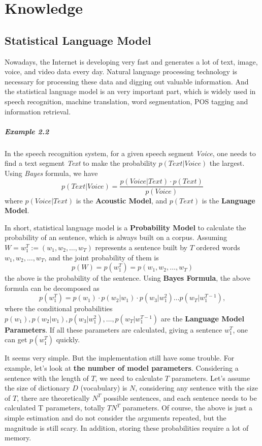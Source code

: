 
\chapter{Knowledge}
\label{cha:knowledgei}

\section{Statistical Language Model}
Nowadays, the Internet is developing very fast and generates a lot of text, image, voice, and video data every day. Natural language processing technology is necessary for processing these data and digging out valuable information. And the statistical language model is an very important part, which is widely used in speech recognition, machine translation, word segmentation, POS tagging and information retrieval. 
\paragraph{Example 2.2} In the speech recognition system, for a given speech segment \emph{Voice}, one needs to find a text segment \emph{Text} to make the probability $p(Text|Voice)$ the largest. Using \emph{Bayes} formula, we have
$$p(Text|Voice)=\frac{p(Voice|Text)\cdot p(Text)}{p(Voice)}$$
where $p(Voice|Text)$ is the \textbf{Acoustic Model}, and $p(Text)$ is the \textbf{Language Model}.

In short, statistical language model is a \textbf{Probability Model} to calculate the probability of an sentence, which is always built on a corpus. Assuming $W=w^T_1:=(w_1,w_2,\ldots,w_T)$ represents a sentence built by $T$ ordered words $w_1,w_2,\ldots,w_T$, and the joint probability of them is
$$p(W)=p(w^T_1)=p(w_1,w_2,\ldots,w_T)$$
the above is the probability of the sentence. Using \textbf{Bayes Formula}, the above formula can be decomposed as
\begin{equation}
p(w^T_1) = p(w_1)\cdot p(w_2|w_1)\cdot p(w_3|w^2_1)\ldots p(w_T|w^{T-1}_1),
\end{equation}
where the conditional probabilities $p(w_1),p(w_2|w_1),p(w_3|w^2_1),\ldots,p(w_T|w^{T-1}_1)$ are the \textbf{Language Model Parameters}. If all these parameters are calculated, giving a sentence $w^T_1$, one can get $p(w^T_1)$ quickly.

It seems very simple. But the implementation still have some trouble. For example, let's look at \textbf{the number of model parameters}. Considering a sentence with the length of $T$, we need to calculate $T$ parameters. Let's assume the size of dictionary $D$ (vocabulary) is $N$, considering any sentence with the size of $T$, there are theoretically $N^T$  possible sentences, and each sentence needs to be calculated T parameters, totally $TN^T$ parameters. Of course, the above is just a simple estimation and do not consider the arguments repeated, but the magnitude is still scary. In addition, storing these probabilities require a lot of memory.

